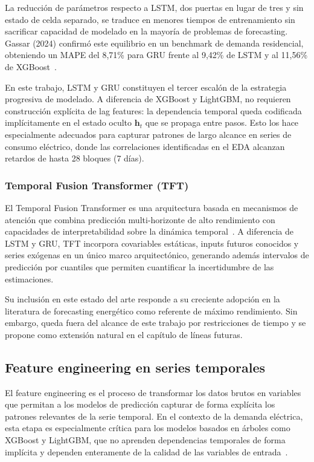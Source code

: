\documentclass[12pt, a4paper]{article}
\begin{document}
La reducción de parámetros respecto a LSTM, dos puertas en lugar de tres y sin estado de celda separado, se traduce en menores tiempos de entrenamiento sin sacrificar capacidad de modelado en la mayoría de problemas de forecasting. Gassar (2024) confirmó este equilibrio en un benchmark de demanda residencial, obteniendo un MAPE del 8,71\% para GRU frente al 9,42\% de LSTM y al 11,56\% de XGBoost~\cite{gassar2024}.

En este trabajo, LSTM y GRU constituyen el tercer escalón de la estrategia progresiva de modelado. A diferencia de XGBoost y LightGBM, no requieren construcción explícita de lag features: la dependencia temporal queda codificada implícitamente en el estado oculto $\mathbf{h}_t$ que se propaga entre pasos. Esto los hace especialmente adecuados para capturar patrones de largo alcance en series de consumo eléctrico, donde las correlaciones identificadas en el EDA alcanzan retardos de hasta 28 bloques (7 días).

\subsubsection{Temporal Fusion Transformer (TFT)}

El Temporal Fusion Transformer es una arquitectura basada en mecanismos de atención que combina predicción multi-horizonte de alto rendimiento con capacidades de interpretabilidad sobre la dinámica temporal~\cite{lim2021}. A diferencia de LSTM y GRU, TFT incorpora covariables estáticas, inputs futuros conocidos y series exógenas en un único marco arquitectónico, generando además intervalos de predicción por cuantiles que permiten cuantificar la incertidumbre de las estimaciones.

Su inclusión en este estado del arte responde a su creciente adopción en la literatura de forecasting energético como referente de máximo rendimiento. Sin embargo, queda fuera del alcance de este trabajo por restricciones de tiempo y se propone como extensión natural en el capítulo de líneas futuras.

\subsection{Feature engineering en series temporales}

El feature engineering es el proceso de transformar los datos brutos en variables que permitan a los modelos de predicción capturar de forma explícita los patrones relevantes de la serie temporal. En el contexto de la demanda eléctrica, esta etapa es especialmente crítica para los modelos basados en árboles como XGBoost y LightGBM, que no aprenden dependencias temporales de forma implícita y dependen enteramente de la calidad de las variables de entrada~\cite{rubattu2023}.
\end{document}

